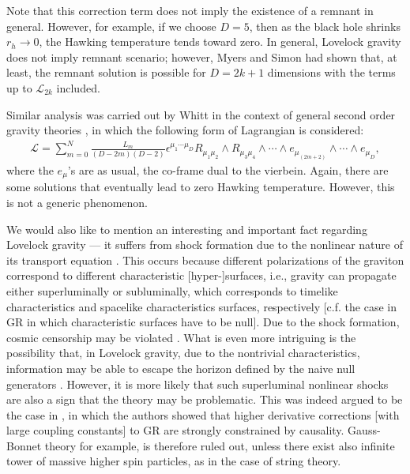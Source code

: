 \documentclass[12pt]{article}
\newcommand{\2}{$^2$}
\newcommand{\3}{$^3$}
\newcommand{\4}{$_4$}
\newcommand{\5}{$_5$}
\begin{document}
Note that this correction term does not imply the existence of a remnant in general. However, for example, if we choose $D=5$, then as the black hole shrinks $r_{h} \rightarrow 0$, the Hawking temperature tends toward zero.  In general, Lovelock gravity does not imply remnant scenario; however, Myers and Simon \cite{Myers:1988ze} had shown that, at least, the remnant solution is possible for $D = 2k + 1$ dimensions with the terms up to $\mathcal{L}_{2k}$ included.

Similar analysis was carried out by Whitt \cite{Whitt:1988ax} in the context of general second order gravity theories \cite{Wheeler:1985qd}, in which the following form of Lagrangian is considered:  
\begin{eqnarray}
\mathcal{L} = \sum_{m=0}^{N} \frac{L_{m}}{(D-2m)(D-2)\!} \epsilon^{\mu_{1} \cdots \mu_{D}} R_{\mu_{1}\mu_{2}} \wedge R_{\mu_{3}\mu_{4}} \wedge \cdots \wedge e_{\mu_{(2m+2)}} \wedge \cdots \wedge e_{\mu_{D}},
\end{eqnarray}
where the $e_{\mu}$'s are as usual, the co-frame dual to the vierbein. Again, there are some solutions that eventually lead to zero Hawking temperature. However, this is not a generic phenomenon.

We would also like to mention an interesting and important fact regarding Lovelock gravity --- it suffers from shock formation due to the nonlinear nature of its transport equation \cite{RTW1, RTW2}. This occurs because different polarizations of the graviton correspond to different characteristic [hyper-]surfaces, i.e., gravity can propagate either superluminally or subluminally, which corresponds to timelike characteristics and spacelike characteristics surfaces, respectively [c.f. the case in GR in which characteristic surfaces have to be null]. Due to the shock formation, cosmic censorship may be violated \cite{RTW1}. What is even more intriguing is the possibility that, in Lovelock gravity, due to the nontrivial characteristics, information may be able to escape the horizon defined by the naive null generators \cite{izumi}. However, it is more likely that such superluminal nonlinear shocks are also a sign that the theory may be problematic. This was indeed argued to be the case in \cite{camanho}, in which the authors showed that higher derivative corrections [with large coupling constants] to GR are strongly constrained by causality.  Gauss-Bonnet theory for example, is therefore ruled out, unless there exist also infinite tower of massive higher spin particles, as in the case of string theory.
\end{document}
